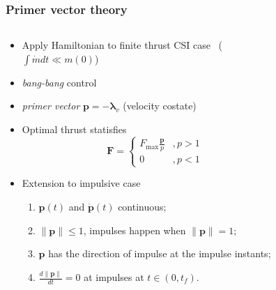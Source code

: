 \documentclass{beamer}
\begin{document}
\begin{frame}
    \frametitle{Primer vector theory}

    \begin{columns}
        \begin{column}{0.7\linewidth}
            \begin{itemize}
                \item Apply Hamiltonian to finite thrust CSI case~\cite{Conway_2010} (\(\int \dot m dt \ll m(0)\))
                \item \textit{bang-bang} control
                \item \textit{primer vector} \(\mathbf{p} = - \mathbf{\lambda}_v\) (velocity costate)
                \item Optimal thrust statisfies
                \begin{equation}
                    \mathbf{F} = \begin{cases}
                        F_{\max} \frac{\mathbf{p}}{p}&, p > 1 \\
                        0&, p < 1
                    \end{cases}
                \end{equation}
                \item Extension to impulsive case
                \begin{enumerate}
                    \item \(\mathbf{p}(t)\) and \(\dot{\mathbf{p}}(t)\) continuous;
                    \item \(\lVert \mathbf{p} \rVert \leq 1\), impulses happen when \(\lVert \mathbf{p} \rVert = 1\);
                    \item \(\mathbf{p}\) has the direction of impulse at the impulse instants;
                    \item \(\frac{d \lVert \mathbf{p} \rVert}{dt} = 0\) at impulses at \(t \in (0, t_f)\).
                \end{enumerate}
            \end{itemize}
        \end{column}
        \begin{column}{0.3\linewidth}
            \begin{figure}[htbp]
                \centering

\end{figure}
\end{column}
\end{columns}
\end{frame}
\end{document}
